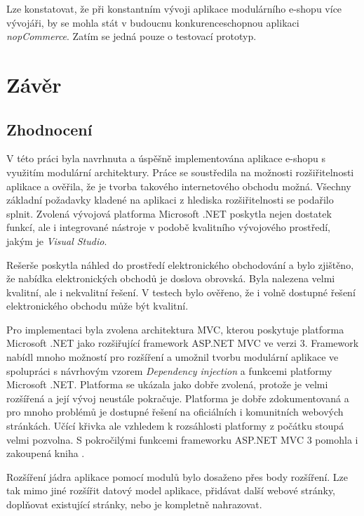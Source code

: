 \documentclass[11pt,twoside,a4paper]{book}
\begin{document}
Lze konstatovat, že při konstantním vývoji aplikace modulárního e-shopu více vývojáři, by se mohla stát v budoucnu konkurenceschopnou aplikaci \textit{nopCommerce}. Zatím se jedná pouze o testovací prototyp.


\chapter{Závěr}
\label{sec:zaver}

\section{Zhodnocení}

V této práci byla navrhnuta a úspěšně implementována aplikace e-shopu s využitím modulární architektury. Práce se soustředila na možnosti rozšiřitelnosti aplikace a ověřila, že je tvorba takového internetového obchodu možná. Všechny základní požadavky kladené na aplikaci z hlediska rozšiřitelnosti se podařilo splnit. Zvolená vývojová platforma Microsoft .NET poskytla nejen dostatek funkcí, ale i integrované nástroje v podobě kvalitního vývojového prostředí, jakým je \textit{Visual Studio}.

Rešerše poskytla náhled do prostředí elektronického obchodování a bylo zjištěno, že nabídka elektronických obchodů je doslova obrovská. Byla nalezena velmi kvalitní, ale i nekvalitní řešení. V testech bylo ověřeno, že i volně dostupné řešení elektronického obchodu může být kvalitní.

Pro implementaci byla zvolena architektura MVC, kterou poskytuje platforma Microsoft .NET jako rozšiřující framework ASP.NET MVC ve verzi 3. Framework nabídl mnoho možností pro rozšíření a umožnil tvorbu modulární aplikace ve spolupráci s návrhovým vzorem \textit{Dependency injection} a funkcemi platformy Microsoft .NET. Platforma se ukázala jako dobře zvolená, protože je velmi rozšířená a její vývoj neustále pokračuje. Platforma je dobře zdokumentovaná a pro mnoho problémů je dostupné řešení na oficiálních i komunitních webových stránkách. Učící křivka ale vzhledem k rozsáhlosti platformy z počátku stoupá velmi pozvolna. S pokročilými funkcemi frameworku ASP.NET MVC 3 pomohla i zakoupená kniha \cite{MVC1}.

Rozšíření jádra aplikace pomocí modulů bylo dosaženo přes body rozšíření. Lze tak mimo jiné rozšířit datový model aplikace, přidávat další webové stránky, doplňovat existující stránky, nebo je kompletně nahrazovat. 
\end{document}
